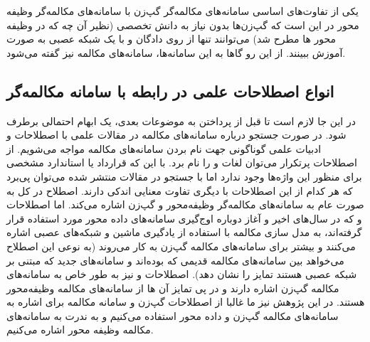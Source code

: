 یکی از تفاوت‌های اساسی سامانه‌های مکالمه‌گر گپ‌زن با سامانه‌های مکالمه‌گر وظیفه محور در این است که گپ‌زن‌ها بدون نیاز به دانش تخصصی (نظیر آن چه که در وظیفه محور ها مطرح شد) می‌توانند تنها از روی دادگان و با یک شبکه عصبی به صورت
آموزش ببینند. از این رو گاها به این سامانه‌ها، سامانه‌های مکالمه 
 نیز گفته می‌شود.

	
\subsection{انواع اصطلاحات علمی در رابطه با سامانه مکالمه‌گر}

در این جا لازم است تا قبل از پرداختن به موضوعات بعدی، یک ابهام احتمالی برطرف شود. در صورت جستجو درباره سامانه‌های مکالمه در مقالات علمی با اصطلاحات و ادبیات علمی گوناگونی جهت نام بردن سامانه‌های مکالمه مواجه می‌شویم. از اصطلاحات پرتکرار می‌توان لغات 
و
را نام برد.
با این که قرارداد یا استاندارد مشخصی برای منظور این واژه‌ها وجود ندارد اما با جستجو در مقالات منتشر شده می‌توان پی‌برد که هر کدام از این اصطلاحات با دیگری تفاوت  معنایی اندکی دارند. اصطلاح 
در کل به صورت عام به سامانه‌های مکالمه‌گر وظیفه‌محور و گپ‌زن اشاره می‌کند. 
اما اصطلاحات 
و
که در سال‌های اخیر و آغاز دوباره اوج‌گیری سامانه‌های داده محور مورد استفاده قرار گرفته‌اند، به مدل سازی مکالمه با استفاده از یادگیری ماشین و شبکه‌های عصبی اشاره می‌کنند و بیشتر برای سامانه‌های مکالمه گپ‌زن به کار می‌روند (به نوعی این اصطلاح می‌خواهد بین سامانه‌های مکالمه قدیمی که 
بود‌ه‌اند و سامانه‌های جدید که مبتنی بر شبکه عصبی هستند تمایز را نشان دهد).
اصطلاحات 
و 
نیز به طور خاص به سامانه‌های مکالمه گپ‌زن اشاره دارند و در پی تمایز آن ها از سامانه‌های مکالمه وظیفه‌محور هستند. 
در این پژوهش نیز ما غالبا از اصطلاحات گپ‌زن  و سامانه مکالمه برای اشاره به سامانه‌های مکالمه گپ‌زن و داده محور استفاده می‌کنیم و به ندرت به سامانه‌های مکالمه وظیفه محور اشاره می‌کنیم. 

